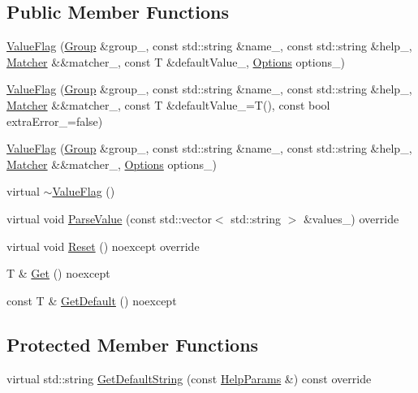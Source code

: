 \subsection*{Public Member Functions}
\begin{DoxyCompactItemize}
\item 
\hyperlink{classargs_1_1_value_flag_a79508651c81bb6bf648bbad03f0ef2f2}{Value\+Flag} (\hyperlink{classargs_1_1_group}{Group} \&group\+\_\+, const std\+::string \&name\+\_\+, const std\+::string \&help\+\_\+, \hyperlink{classargs_1_1_matcher}{Matcher} \&\&matcher\+\_\+, const T \&default\+Value\+\_\+, \hyperlink{namespaceargs_aa530c0f95194aa275f49a5f299ac9e77}{Options} options\+\_\+)
\item 
\hyperlink{classargs_1_1_value_flag_ae2be9efefe2226c5fc9922e962c0d077}{Value\+Flag} (\hyperlink{classargs_1_1_group}{Group} \&group\+\_\+, const std\+::string \&name\+\_\+, const std\+::string \&help\+\_\+, \hyperlink{classargs_1_1_matcher}{Matcher} \&\&matcher\+\_\+, const T \&default\+Value\+\_\+=T(), const bool extra\+Error\+\_\+=false)
\item 
\hyperlink{classargs_1_1_value_flag_ad3126eb9ac5c936e8ed9c4652796bf1c}{Value\+Flag} (\hyperlink{classargs_1_1_group}{Group} \&group\+\_\+, const std\+::string \&name\+\_\+, const std\+::string \&help\+\_\+, \hyperlink{classargs_1_1_matcher}{Matcher} \&\&matcher\+\_\+, \hyperlink{namespaceargs_aa530c0f95194aa275f49a5f299ac9e77}{Options} options\+\_\+)
\item 
virtual \hyperlink{classargs_1_1_value_flag_a17daaa10bc9b93dfc8788a35e1368d24}{$\sim$\+Value\+Flag} ()
\item 
virtual void \hyperlink{classargs_1_1_value_flag_af3a872ae8fb0fa34814cbc7e133aa9bf}{Parse\+Value} (const std\+::vector$<$ std\+::string $>$ \&values\+\_\+) override
\item 
virtual void \hyperlink{classargs_1_1_value_flag_a4300f5a4d96e46810767348d3758cc78}{Reset} () noexcept override
\item 
T \& \hyperlink{classargs_1_1_value_flag_a0a1d7aeb2db89af561f72f6839d152d4}{Get} () noexcept
\item 
const T \& \hyperlink{classargs_1_1_value_flag_a80f91693dac484d0e89229bd2bf2ea5d}{Get\+Default} () noexcept
\end{DoxyCompactItemize}
\subsection*{Protected Member Functions}
\begin{DoxyCompactItemize}
\item 
virtual std\+::string \hyperlink{classargs_1_1_value_flag_a47aa01f545a1781583c96af12c8e2062}{Get\+Default\+String} (const \hyperlink{structargs_1_1_help_params}{Help\+Params} \&) const override
\end{DoxyCompactItemize}
